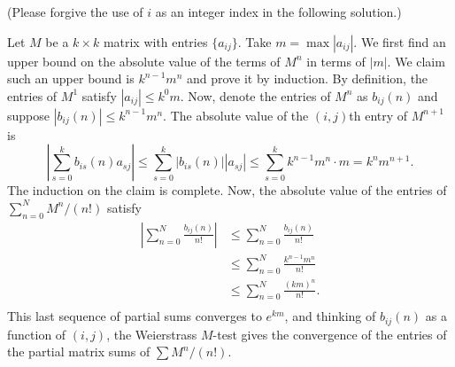 \documentclass{homework}
\begin{document}
  (Please forgive the use of $i$ as an integer index in the following solution.)
\begin{solution}
Let $M$ be a $k\times k$ matrix with entries $\{a_{ij}\}$. Take $m = \max |a_{ij}|$.  We first find an upper bound on the absolute value of the terms of $M^n$ in terms of $|m|$.  We claim such an upper bound is $ k^{n-1}m^n $ and prove it by induction.  By definition, the entries of $M^1$ satisfy $|a_{ij}| \le k^0 m$.  Now, denote the entries of $M^n$ as $b_{ij}(n)$ and suppose $|b_{ij}(n)| \le k^{n-1}m^n$. The absolute value of the $(i,j)$th entry of $M^{n+1}$ is
  $$
    \left|\sum_{s=0}^k b_{is}(n) a_{sj}\right| \le \sum_{s=0}^k |b_{is}(n)| |a_{sj}| \le \sum_{s=0}^k k^{n-1}m^n \cdot m = k^nm^{n+1}.
  $$
  The induction on the claim is complete. Now, the absolute value of the entries of $\sum_{n=0}^N M^n /(n!)$ satisfy
  \begin{align*}
    \left|\sum_{n=0}^N \frac{b_{ij}(n)}{n!}\right| 
    &\le \sum_{n=0}^N \frac{b_{ij}(n)}{n!} \\
    &\le \sum_{n=0}^N \frac{k^{n-1}m^n}{n!} \\
    &\le \sum_{n=0}^N \frac{(km)^n}{n!}. \\
  \end{align*}
  This last sequence of partial sums converges to $e^{km}$, and thinking of $b_{ij}(n)$ as a function of $(i,j)$, the Weierstrass $M$-test gives the convergence of the entries of the partial matrix sums of $\sum M^n/(n!)$.
\end{solution}
\end{document}
